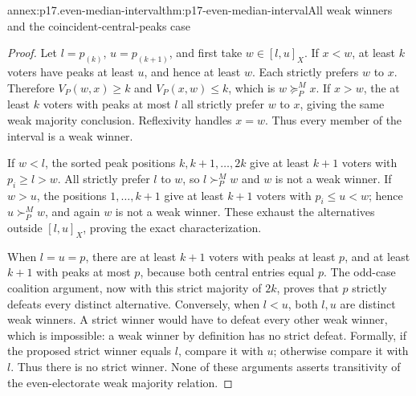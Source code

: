 \begin{annexitem}{annex:p17.even-median-interval}{thm:p17-even-median-interval}{All weak winners and the coincident-central-peaks case}
\begin{proof}
Let \(l=p_{(k)}\), \(u=p_{(k+1)}\), and first take
\(w\in[l,u]_X\). If \(x<w\), at least \(k\) voters have
peaks at least \(u\), and hence at least \(w\). Each strictly
prefers \(w\) to \(x\). Therefore
\(V_P(w,x)\geq k\) and \(V_P(x,w)\leq k\), which is
\(w\succeq^M_P x\). If \(x>w\), the at least \(k\) voters
with peaks at most \(l\) all strictly prefer \(w\) to \(x\),
giving the same weak majority conclusion. Reflexivity handles
\(x=w\). Thus every member of the interval is a weak winner.

If \(w<l\), the sorted peak positions \(k,k+1,\ldots,2k\)
give at least \(k+1\) voters with \(p_i\geq l>w\).
All strictly prefer \(l\) to \(w\), so \(l\succ^M_P w\)
and \(w\) is not a weak winner. If \(w>u\), the positions
\(1,\ldots,k+1\) give at least \(k+1\) voters with
\(p_i\leq u<w\); hence \(u\succ^M_P w\), and again
\(w\) is not a weak winner. These exhaust the alternatives outside
\([l,u]_X\), proving the exact characterization.

When \(l=u=p\), there are at least \(k+1\) voters with
peaks at least \(p\), and at least \(k+1\) with peaks at most
\(p\), because both central entries equal \(p\). The odd-case
coalition argument, now with this strict majority of \(2k\), proves
that \(p\) strictly defeats every distinct alternative. Conversely,
when \(l<u\), both \(l,u\) are distinct weak winners. A strict
winner would have to defeat every other weak winner, which is impossible:
a weak winner by definition has no strict defeat. Formally, if the
proposed strict winner equals \(l\), compare it with \(u\);
otherwise compare it with \(l\). Thus there is no strict winner.
None of these arguments asserts transitivity of the even-electorate
weak majority relation.
\end{proof}
\end{annexitem}

